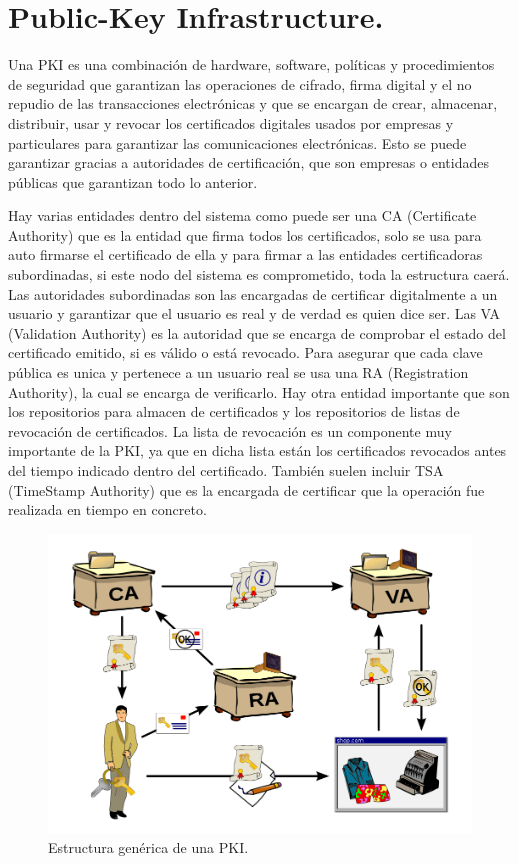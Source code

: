 \section{Public-Key Infrastructure.}

Una PKI es una combinación de hardware, software, políticas y procedimientos de seguridad que garantizan las operaciones de cifrado, firma digital y el no repudio de las transacciones electrónicas y que se encargan de crear, almacenar, distribuir, usar y revocar los certificados digitales usados por empresas y particulares para garantizar las comunicaciones electrónicas. Esto se puede garantizar gracias a autoridades de certificación, que son empresas o entidades públicas que garantizan todo lo anterior.

Hay varias entidades dentro del sistema como puede ser una CA (Certificate Authority) que es la entidad que firma todos los certificados, solo se usa para auto firmarse el certificado de ella y para firmar a las entidades certificadoras subordinadas, si este nodo del sistema es comprometido, toda la estructura caerá. Las autoridades subordinadas son las encargadas de certificar digitalmente a un usuario y garantizar que el usuario es real y de verdad es quien dice ser.  Las VA (Validation Authority) es la autoridad que se encarga de comprobar el estado del certificado emitido, si es válido o está revocado. Para asegurar que cada clave pública es unica y pertenece a un usuario real se usa una RA (Registration Authority), la cual se encarga de verificarlo. Hay otra entidad importante que son los repositorios para almacen de certificados y los repositorios de listas de revocación de certificados. La lista de revocación es un componente muy importante de la PKI, ya que en dicha lista están los certificados revocados antes del tiempo indicado dentro del certificado. También suelen incluir TSA (TimeStamp Authority) que es la encargada de certificar que la operación fue realizada en tiempo en concreto.

\begin{figure}
  \centering
    \includegraphics[scale=0.3]{./Criptografia/imagenes/esquemaPKI.png}
  \caption{Estructura genérica de una PKI.}
  \label{fig:esquemaPKI}
\end{figure} 

